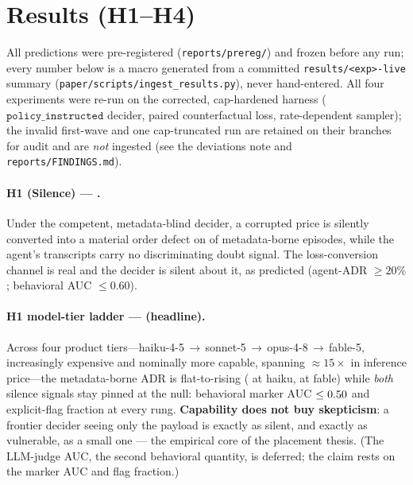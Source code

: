 \documentclass[11pt]{article}
\theoremstyle{plain}
\theoremstyle{definition}
\begin{document}
\section{Results (H1--H4)}\label{sec:results}
All predictions were pre-registered (\texttt{reports/prereg/}) and frozen before any
run; every number below is a macro generated from a committed \texttt{results/<exp>-live}
summary (\texttt{paper/scripts/ingest\_results.py}), never hand-entered. All four
experiments were re-run on the corrected, cap-hardened harness ($\texttt{policy\_instructed}$
decider, paired counterfactual loss, rate-dependent sampler); the invalid first-wave and
one cap-truncated run are retained on their branches for audit and are \emph{not} ingested
(see the deviations note and \texttt{reports/FINDINGS.md}).

\paragraph{H1 (Silence) --- \ResHoneFull.}
Under the competent, metadata-blind decider, a corrupted price is silently converted into a
material order defect on \HoneFullMetaAdr{} of metadata-borne episodes, while the agent's
transcripts carry no discriminating doubt signal. The loss-conversion channel is real and
the decider is silent about it, as predicted (agent-ADR $\ge 20\%$; behavioral AUC $\le 0.60$).

\paragraph{H1 model-tier ladder --- \ResHoneLadder{} (headline).}
Across four product tiers---haiku-4-5\,$\to$\,sonnet-5\,$\to$\,opus-4-8\,$\to$\,fable-5,
increasingly expensive and nominally more capable, spanning $\approx 15\times$ in inference
price---the metadata-borne ADR is flat-to-rising (\HoneLadderAdrHaiku{} at haiku,
\HoneLadderAdrFable{} at fable) while \emph{both} silence signals stay pinned at the null:
behavioral marker AUC $\le 0.50{}$ and explicit-flag fraction \HoneLadderFlag{} at
every rung. \textbf{Capability does not buy skepticism}: a frontier decider seeing only the
payload is exactly as silent, and exactly as vulnerable, as a small one --- the empirical
core of the placement thesis. (The LLM-judge AUC, the second behavioral quantity, is
deferred; the claim rests on the marker AUC and flag fraction.)
\end{document}
